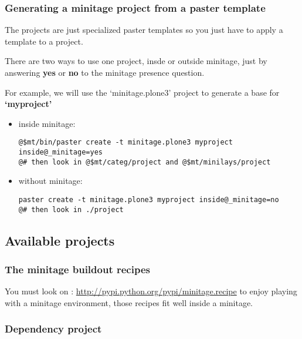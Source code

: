 \documentclass[letterpaper,10pt,english]{sphinxmanual}
\begin{document}
\subsubsection{Generating a minitage project from a paster template}
\label{paster/projects/index:generating-a-minitage-project-from-a-paster-template}
The projects are just specialized paster templates so you just have to apply a template to a project.

There are two ways to use one project, insde or outside minitage, just by answering  \textbf{yes} or \textbf{no} to the minitage presence question.

For example, we will use the `minitage.plone3' project to generate a base for \textbf{`myproject'}
\begin{itemize}
\item {} 
inside minitage:

\begin{Verbatim}[commandchars=@\[\]]
@$mt/bin/paster create -t minitage.plone3 myproject inside@_minitage=yes
@# then look in @$mt/categ/project and @$mt/minilays/project
\end{Verbatim}

\item {} 
without minitage:

\begin{Verbatim}[commandchars=@\[\]]
paster create -t minitage.plone3 myproject inside@_minitage=no
@# then look in ./project
\end{Verbatim}

\end{itemize}


\subsection{Available projects}
\label{paster/projects/index:available-projects}

\subsubsection{The minitage buildout recipes}
\label{paster/projects/packaging_projects:the-minitage-buildout-recipes}\label{paster/projects/packaging_projects:depproject}\label{paster/projects/packaging_projects::doc}
You must look on : \href{http://pypi.python.org/pypi/minitage.recipe}{http://pypi.python.org/pypi/minitage.recipe} to enjoy playing
with a minitage environment, those recipes fit well inside a minitage.


\subsubsection{Dependency project}
\label{paster/projects/packaging_projects:dependency-project}
\end{document}
